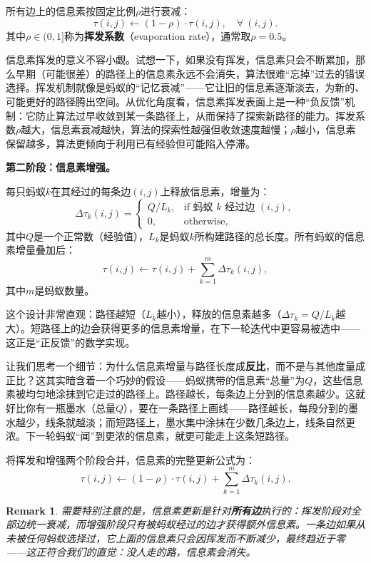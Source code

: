 \documentclass[lang=cn,zihao=-4,a4paper,fontset=windows]{beautybook}
\newtheorem*{remark}{\textbf{Remark}}
\begin{document}
\begin{definition}[][信息素挥发]
所有边上的信息素按固定比例$\rho$进行衰减：
\[
\tau(i,j) \leftarrow (1 - \rho) \cdot \tau(i,j), \quad \forall\ (i,j).
\]
其中$\rho \in (0,1]$称为\textbf{挥发系数}（evaporation rate），通常取$\rho = 0.5$。
\end{definition}

信息素挥发的意义不容小觑。试想一下，如果没有挥发，信息素只会不断累加，那么早期（可能很差）的路径上的信息素永远不会消失，算法很难“忘掉”过去的错误选择。挥发机制就像是蚂蚁的“记忆衰减”——它让旧的信息素逐渐淡去，为新的、可能更好的路径腾出空间。从优化角度看，信息素挥发表面上是一种“负反馈”机制：它防止算法过早收敛到某一条路径上，从而保持了探索新路径的能力。挥发系数$\rho$越大，信息素衰减越快，算法的探索性越强但收敛速度越慢；$\rho$越小，信息素保留越多，算法更倾向于利用已有经验但可能陷入停滞。

\textbf{第二阶段：信息素增强。}

\begin{definition}[][信息素增强]
每只蚂蚁$k$在其经过的每条边$(i,j)$上释放信息素，增量为：
\[
\Delta\tau_k(i,j) = \begin{cases}
Q / L_k, & \text{if 蚂蚁 } k \text{ 经过边 } (i,j), \\
0, & \text{otherwise},
\end{cases}
\]
其中$Q$是一个正常数（经验值），$L_k$是蚂蚁$k$所构建路径的总长度。所有蚂蚁的信息素增量叠加后：
\[
\tau(i,j) \leftarrow \tau(i,j) + \sum_{k=1}^{m} \Delta\tau_k(i,j),
\]
其中$m$是蚂蚁数量。
\end{definition}

这个设计非常直观：路径越短（$L_k$越小），释放的信息素越多（$\Delta\tau_k = Q/L_k$越大）。短路径上的边会获得更多的信息素增量，在下一轮迭代中更容易被选中——这正是“正反馈”的数学实现。

让我们思考一个细节：为什么信息素增量与路径长度成\textbf{反比}，而不是与其他度量成正比？这其实暗含着一个巧妙的假设——蚂蚁携带的信息素“总量”为$Q$，这些信息素被均匀地涂抹到它走过的路径上。路径越长，每条边上分到的信息素越少。这就好比你有一瓶墨水（总量$Q$），要在一条路径上画线——路径越长，每段分到的墨水越少，线条就越淡；而短路径上，墨水集中涂抹在少数几条边上，线条自然更浓。下一轮蚂蚁“闻”到更浓的信息素，就更可能走上这条短路径。

将挥发和增强两个阶段合并，信息素的完整更新公式为：
\[
\tau(i,j) \leftarrow (1 - \rho) \cdot \tau(i,j) + \sum_{k=1}^{m} \Delta\tau_k(i,j).
\]

\begin{remark}
需要特别注意的是，信息素更新是针对\textbf{所有边}执行的：挥发阶段对全部边统一衰减，而增强阶段只有被蚂蚁经过的边才获得额外信息素。一条边如果从未被任何蚂蚁选择过，它上面的信息素只会因挥发而不断减少，最终趋近于零——这正符合我们的直觉：没人走的路，信息素会消失。
\end{remark}
\end{document}
